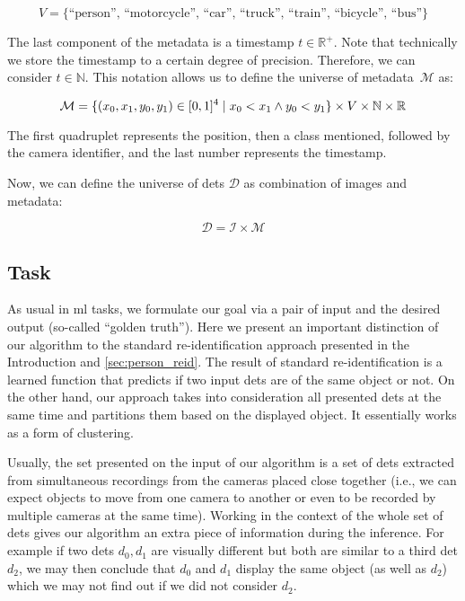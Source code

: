 $$V = \{\text{``person'', ``motorcycle'', ``car'', ``truck'', ``train'', ``bicycle'', ``bus''\}}$$


The last component of the metadata is a timestamp $t \in \mathbb{R}^+$. Note that technically we store the timestamp to a certain degree of precision. Therefore, we can consider $t \in \mathbb{N}$. This notation allows us to define the universe of metadata~$\mathcal{M}$ as:

$$\mathcal{M} = \{{(x_0, x_1, y_0, y_1) \in [0,1]^4 \mid x_0 < x_1 \land y_0 < y_1}\} \times V \times \mathbb{N} \times \mathbb{R}$$

The first quadruplet represents the position, then a class mentioned, followed by the camera identifier, and the last number represents the timestamp.

Now, we can define the universe of \glspl{det} $\mathcal{D}$ as combination of images and metadata:

$$\mathcal{D} = \mathcal{I \times M}$$

\subsection{Task}

\label{ssec:task}

As usual in \gls{ml} tasks, we formulate our goal via a pair of input and the desired output (so-called ``golden truth''). Here we present an important distinction of our algorithm to the standard re-identification approach presented in the Introduction and \autoref{sec:person_reid}. The result of standard re-identification is a learned function that predicts if two input \glspl{det} are of the same object or not. On the other hand, our approach takes into consideration all presented \glspl{det} at the same time and partitions them based on the displayed object. It essentially works as a form of clustering.

Usually, the set presented on the input of our algorithm is a set of \glspl{det} extracted from simultaneous recordings from the cameras placed close together (i.e., we can expect objects to move from one camera to another or even to be recorded by multiple cameras at the same time). Working in the context of the whole set of \glspl{det} gives our algorithm an extra piece of information during the inference. For example if two \glspl{det} $d_0, d_1$ are visually different but both are similar to a third \gls{det} $d_2$, we may then conclude that $d_0$ and $d_1$ display the same object (as well as $d_2$) which we may not find out if we did not consider $d_2$.


